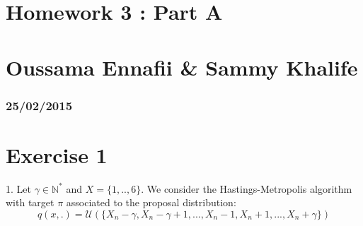 


\geometry{hmargin=2.5cm,vmargin=2cm}   


\section*{Homework 3 :  Part A}
\section*{Oussama Ennafii \& Sammy Khalife}
\subsubsection*{25/02/2015}

\section*{Exercise 1}
1. Let $\gamma \in \mathbb{N^*}$ and $X=\{1,..,6\}$. We consider the Hastings-Metropolis algorithm with target $\pi$ associated to the proposal distribution:
$$q(x,.)=\mathcal{U}(\{X_n - \gamma, X_n-\gamma+1,..., X_n-1, X_n+1,...,X_n+\gamma\})$$~\\

